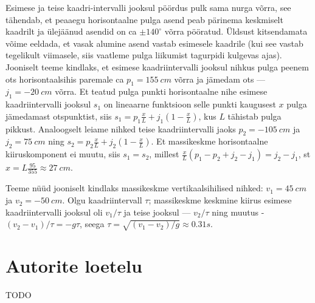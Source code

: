 \documentclass[10pt]{article}
\begin{document}
\solu
Esimese ja teise kaadri-intervalli jooksul pöördus pulk sama nurga võrra, see tähendab, et peaaegu horisontaalne pulga asend peab pärinema keskmiselt kaadrilt ja ülejäänud asendid on ca $\pm 140^\circ$ võrra pööratud. Üldsust kitsendamata võime eeldada, et vasak alumine asend vastab esimesele kaadrile (kui see vastab tegelikult viimasele, siis vaatleme pulga liikumist tagurpidi kulgevas ajas). Jooniselt teeme kindlaks, et esimese kaadriintervalli jooksul nihkus pulga peenem ots horisontaalsihis paremale ca $p_1=\SI{155}{cm}$ võrra ja jämedam ots --- $j_1=\SI{-20}{cm}$  võrra. Et teatud pulga punkti horisontaalne nihe esimese kaadriintervalli jooksul $s_1$ on lineaarne funktsioon selle punkti kaugusest $x$ pulga jämedamast otspunktist, siis $s_1=p_1\frac xL+j_1(1-\frac xL)$, kus $L$ tähistab pulga pikkust. Analoogselt leiame nihked teise kaadriintervalli jaoks $p_2=\SI{-105}{cm}$ ja $j_2=\SI{75}{cm}$ ning $s_2=p_2\frac xL+j_2(1-\frac xL)$. Et massikeskme horisontaalne kiiruskomponent ei muutu, siis $s_1=s_2$, millest $\frac xL(p_1-p_2+j_2-j_1)=j_2-j_1$, st $x=L\frac{95}{355}\approx \SI{27}{cm}$.

Teeme nüüd jooniselt kindlaks massikeskme vertikaalsihilised nihked: $v_1=\SI{45}{cm}$ ja $v_2=\SI{-50}{cm}$.
Olgu kaadriintervall $\tau$; massikeskme keskmine kiirus esimese kaadriintervalli jooksul oli $v_1/\tau$ ja teise jooksul --- $v_2/\tau$ ning muutus - $(v_2-v_1)/\tau= -g\tau$, seega $\tau=\sqrt{(v_1-v_2)/g}\approx \SI{0.31}s$.
\probend
\bigskip
\newpage

\section{Autorite loetelu}

TODO
\end{document}
